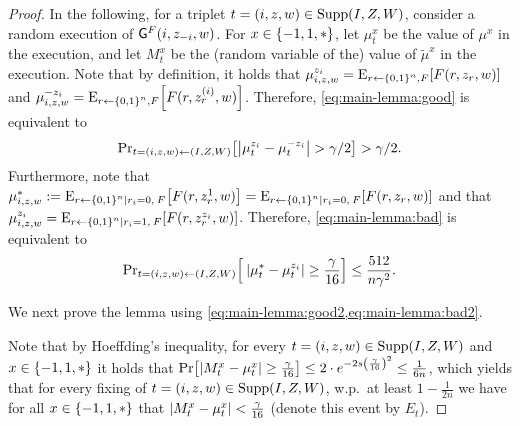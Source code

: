 \begin{proof}
	In the following, for a triplet $t = (i,z,w) \in \operatorname{Supp}(I,Z,W)$, consider a random execution of $\mathsf{G}^F(i,z_{-i},w)$. For $x \in \set{-1,1,*}$, let $\mu^x_t$ be the value of $\mu^x$ in the execution, and let $M^x_t$ be the (random variable of the) value of $\tilde{\mu}^x$ in the execution. Note that by definition, it holds that $\mu_{i,z,w}^{z_i} = \eex{r \la \zo^n, F}{F(r,z_{r},w)}$ and $\mu_{i,z,w}^{-z_i} = \eex{r \la \zo^n, F}{F(r,z^{(i)}_{r},w)}$. Therefore, \cref{eq:main-lemma:good} is equivalent to 
	\begin{align}\label{eq:main-lemma:good2}
		\ppr{t=(i,z,w) \la (I,Z,W)}{\size{\mu_t^{z_i} - \mu_t^{-z_i}} > \gamma/2} > \gamma/2.
	\end{align}
	Furthermore, note that $\mu_{i,z,w}^* \eqdef \eex{r \la \zo^n \mid r_i = 0, \: F}{F(r,z^1_{r}, w)} = \eex{r \la \zo^n \mid r_i = 0, \: F}{F(r,z_{r}, w)}$ and that $\mu_{i,z,w}^{z_i} = \eex{r \la \zo^n \mid r_i = 1, \: F}{F(r,z^{z_i}_{r}, w)}$. Therefore, \cref{eq:main-lemma:bad} is equivalent to 
	\begin{align}\label{eq:main-lemma:bad2}
		\ppr{t = (i,z,w) \la (I,Z,W)}{\: \size{\mu_t^* - \mu_t^{z_i}}\geq \frac{\gamma}{16}}  \leq \frac{512}{n \gamma^2}.
	\end{align}
	
	We next prove the lemma using \cref{eq:main-lemma:good2,eq:main-lemma:bad2}.
	
	Note that by Hoeffding's inequality, for every $t = (i,z,w) \in \operatorname{Supp}(I,Z,W)$ and  $x \in \set{-1,1,*}$ it holds that $\pr{\size{M_t^x - \mu_t^x} \geq \frac{\gamma}{16}} \leq 2\cdot e^{-2 s \paren{\frac{\gamma}{16}}^2} \leq \frac1{6n}$, which yields that for every fixing of $t = (i,z,w) \in \operatorname{Supp}(I,Z,W)$, w.p.\ at least $1-\frac1{2n}$ we have for all $x \in \set{-1,1,*}$ that $\size{M_t^x - \mu_t^x} < \frac{\gamma}{16}$ (denote this event by $E_t$).
	

\end{proof}
